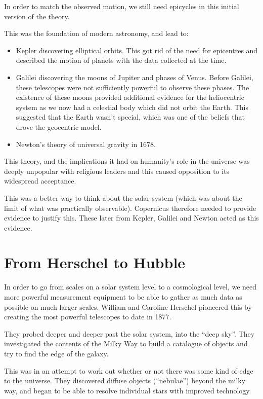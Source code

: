 In order to match the observed motion, we still need epicycles in this initial version of the theory.

This was the foundation of modern astronomy, and lead to:
\begin{itemize}
    \item Kepler discovering elliptical orbits. This got rid of the need for epicentres and described the motion of planets with the data collected at the time.
    \item Galilei discovering the moons of Jupiter and phases of Venus. Before Galilei, these telescopes were not sufficiently powerful to observe these phases. The existence of these moons provided additional evidence for the heliocentric system as we now had a celestial body which did not orbit the Earth. This suggested that the Earth wasn't special, which was one of the beliefs that drove the geocentric model.
    \item Newton's theory of universal gravity in 1678.
\end{itemize}

This theory, and the implications it had on humanity's role in the universe was deeply unpopular with religious leaders and this caused opposition to its widespread acceptance.

This was a better way to think about the solar system (which was about the limit of what was practically observable). Copernicus therefore needed to provide evidence to justify this. These later from Kepler, Galilei and Newton acted as this evidence.

\section{From Herschel to Hubble}
In order to go from scales on a solar system level to a cosmological level, we need more powerful measurement equipment to be able to gather as much data as possible on much larger scales. William and Caroline Herschel pioneered this by creating the most powerful telescopes to date in 1877.

They probed deeper and deeper past the solar system, into the ``deep sky''. They investigated the contents of the Milky Way to build a catalogue of objects and try to find the edge of the galaxy. 

This was in an attempt to work out whether or not there was some kind of edge to the universe. They discovered diffuse objects (``nebulae'') beyond the milky way, and began to be able to resolve individual stars with improved technology.


